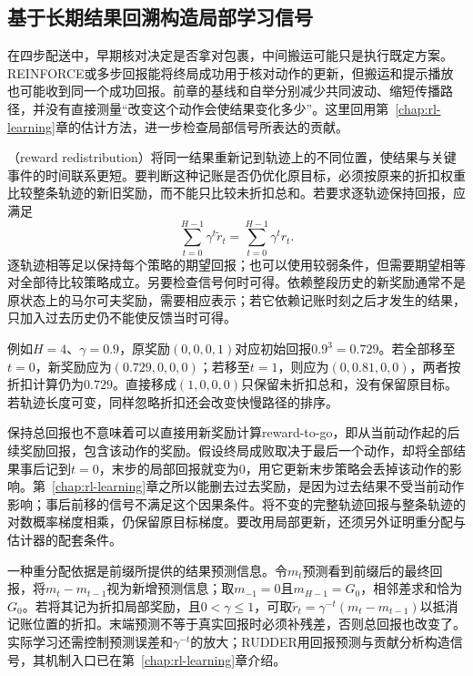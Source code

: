 \subsection{基于长期结果回溯构造局部学习信号}
\label{sec:rl-reward-redistribution}

在四步配送中，早期核对决定是否拿对包裹，中间搬运可能只是执行既定方案。REINFORCE或多步回报能将终局成功用于核对动作的更新，但搬运和提示播放也可能收到同一个成功回报。前章的基线和自举分别减少共同波动、缩短传播路径，并没有直接测量“改变这个动作会使结果变化多少”。这里回用第~\ref{chap:rl-learning}章的估计方法，进一步检查局部信号所表达的贡献。

（reward redistribution）将同一结果重新记到轨迹上的不同位置，使结果与关键事件的时间联系更短。要判断这种记账是否仍优化原目标，必须按原来的折扣权重比较整条轨迹的新旧奖励，而不能只比较未折扣总和。若要求逐轨迹保持回报，应满足
\begin{equation}
  \sum_{t=0}^{H-1}\gamma^t\widetilde r_t
    =\sum_{t=0}^{H-1}\gamma^t r_t.
  \label{eq:rl-reward-redistribution}
\end{equation}
逐轨迹相等足以保持每个策略的期望回报；也可以使用较弱条件，但需要期望相等对全部待比较策略成立。另要检查信号何时可得。依赖整段历史的新奖励通常不是原状态上的马尔可夫奖励，需要相应表示；若它依赖记账时刻之后才发生的结果，只加入过去历史仍不能使反馈当时可得。

例如$H=4$、$\gamma=0.9$，原奖励$(0,0,0,1)$对应初始回报$0.9^3=0.729$。若全部移至$t=0$，新奖励应为$(0.729,0,0,0)$；若移至$t=1$，则应为$(0,0.81,0,0)$，两者按折扣计算仍为$0.729$。直接移成$(1,0,0,0)$只保留未折扣总和，没有保留原目标。若轨迹长度可变，同样忽略折扣还会改变快慢路径的排序。

保持总回报也不意味着可以直接用新奖励计算reward-to-go，即从当前动作起的后续奖励回报，包含该动作的奖励。假设终局成败取决于最后一个动作，却将全部结果事后记到$t=0$，末步的局部回报就变为0，用它更新末步策略会丢掉该动作的影响。第~\ref{chap:rl-learning}章之所以能删去过去奖励，是因为过去结果不受当前动作影响；事后前移的信号不满足这个因果条件。将不变的完整轨迹回报与整条轨迹的对数概率梯度相乘，仍保留原目标梯度。要改用局部更新，还须另外证明重分配与估计器的配套条件。

一种重分配依据是前缀所提供的结果预测信息。令$m_t$预测看到前缀后的最终回报，将$m_t-m_{t-1}$视为新增预测信息；取$m_{-1}=0$且$m_{H-1}=G_0$，相邻差求和恰为$G_0$。若将其记为折扣局部奖励，且$0<\gamma\leq1$，可取$\widetilde r_t=\gamma^{-t}(m_t-m_{t-1})$以抵消记账位置的折扣。末端预测不等于真实回报时必须补残差，否则总回报也改变了。实际学习还需控制预测误差和$\gamma^{-t}$的放大；RUDDER用回报预测与贡献分析构造信号，其机制入口已在第~\ref{chap:rl-learning}章介绍。

